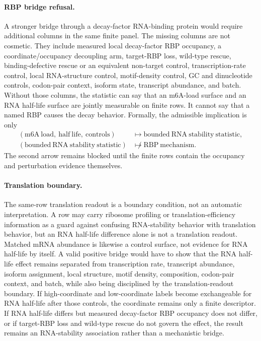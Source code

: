 \paragraph{RBP bridge refusal.}
A stronger bridge through a decay-factor RNA-binding protein would require additional columns in the same finite panel.  The missing columns are not cosmetic.  They include measured local decay-factor RBP occupancy, a coordinate/occupancy decoupling arm, target-RBP loss, wild-type rescue, binding-defective rescue or an equivalent non-target control, transcription-rate control, local RNA-structure control, motif-density control, GC and dinucleotide controls, codon-pair context, isoform state, transcript abundance, and batch.  Without those columns, the statistic can say that an m6A-load surface and an RNA half-life surface are jointly measurable on finite rows.  It cannot say that a named RBP causes the decay behavior.  Formally, the admissible implication is only
$$\begin{aligned}
  (\mathrm{m6A\ load},\ \mathrm{half\ life},\ \mathrm{controls})
  &\longmapsto \mathrm{bounded\ RNA\ stability\ statistic},\\
  (\mathrm{bounded\ RNA\ stability\ statistic})
  &\not\longmapsto \mathrm{RBP\ mechanism}.
\end{aligned}$$
The second arrow remains blocked until the finite rows contain the occupancy and perturbation evidence themselves.

\paragraph{Translation boundary.}
The same-row translation readout is a boundary condition, not an automatic interpretation.  A row may carry ribosome profiling or translation-efficiency information as a guard against confusing RNA-stability behavior with translation behavior, but an RNA half-life difference alone is not a translation readout.  Matched mRNA abundance is likewise a control surface, not evidence for RNA half-life by itself.  A valid positive bridge would have to show that the RNA half-life effect remains separated from transcription rate, transcript abundance, isoform assignment, local structure, motif density, composition, codon-pair context, and batch, while also being disciplined by the translation-readout boundary.  If high-coordinate and low-coordinate labels become exchangeable for RNA half-life after those controls, the coordinate remains only a finite descriptor.  If RNA half-life differs but measured decay-factor RBP occupancy does not differ, or if target-RBP loss and wild-type rescue do not govern the effect, the result remains an RNA-stability association rather than a mechanistic bridge.


